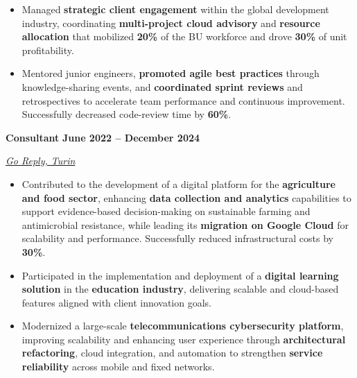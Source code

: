 \documentclass[9pt, a4paper]{article}
\newcommand{\cvsubsection}[3]{%
	\par {\large\bfseries #1} \hfill {\bfseries #2} \par {\textit{#3}} \vspace{4pt}
}
\begin{document}
\begin{minipage}[t]{0.67\linewidth}
\begin{itemize}[leftmargin=*, nosep]
			\vspace{2pt}
			\item \footnotesize Managed \textbf{strategic client engagement} within the global development industry, coordinating \textbf{multi-project cloud advisory} and \textbf{resource allocation} that mobilized \textbf{20\%} of the BU workforce and drove \textbf{30\%} of unit profitability.
			
			\vspace{2pt}
			\item \footnotesize Mentored junior engineers, \textbf{promoted agile best practices} through knowledge-sharing events, and \textbf{coordinated sprint reviews} and retrospectives to accelerate team performance and continuous improvement. 
			Successfully decreased code-review time by \textbf{60\%}.  
		\end{itemize}
		
		\vspace{6pt}
		\cvsubsection{Consultant}{June 2022 -- December 2024}{\href{https://www.reply.com/go-reply/en}{Go Reply, Turin}}
		\begin{itemize}[leftmargin=*, nosep]
			
			\item \footnotesize Contributed to the development of a digital platform for the \textbf{agriculture and food sector}, enhancing \textbf{data collection and analytics} capabilities to support evidence-based decision-making on sustainable farming and antimicrobial resistance, while leading its \textbf{migration on Google Cloud} for scalability and performance. Successfully reduced infrastructural costs by \textbf{30\%}.
			
			\vspace{2pt}
			\item \footnotesize Participated in the implementation and deployment of a \textbf{digital learning solution} in the \textbf{education industry}, delivering scalable and cloud-based features aligned with client innovation goals.
			
			\vspace{2pt}
			\item \footnotesize Modernized a large-scale \textbf{telecommunications cybersecurity platform}, improving scalability and enhancing user experience through \textbf{architectural refactoring}, cloud integration, and automation to strengthen \textbf{service reliability} across mobile and fixed networks. 
		\end{itemize}
		

\end{minipage}
\end{document}
